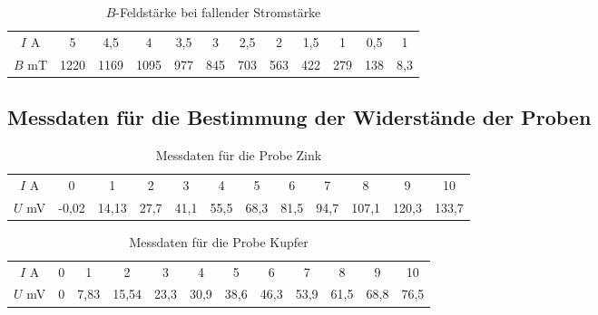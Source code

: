 \begin{table}
 \centering
 \label{tab:Messergebnisse_Feldstärke_Ifällt}
 \begin{tabular}[width=\textwidth]{S S[table-format=4.0] S[table-format=4.1] S[table-format=4.0] S[table-format=3.1] S[table-format=3.0] S[table-format=3.1] S[table-format=3.0] S[table-format=3.1] S[table-format=3.0] S[table-format=3.1] S[table-format=3.1]}
     \toprule
     \midrule
      $I$  \si{\ampere} & 5 & 4,5 & 4 & 3,5 & 3 & 2,5 & 2 & 1,5 & 1 & 0,5 & 1 \\
      $B$  \si{\milli\tesla} & 1220 & 1169 & 1095 & 977 & 845 & 703 & 563 & 422 & 279 & 138 & 8,3 \\
      \bottomrule
\end{tabular}
  \caption{$B$-Feldstärke bei fallender Stromstärke}
\end{table}

\subsection{Messdaten für die Bestimmung der Widerstände der Proben}

\begin{table}
 \centering
 \label{tab:Spannung_Zink}
 \begin{tabular}[width=\textwidth]{S S[table-format=1.2] S[table-format=2.2] S[table-format=2.1] S[table-format=2.1] S[table-format=2.1] S[table-format=2.1] S[table-format=2.1] S[table-format=2.1] S[table-format=3.1] S[table-format=3.1] S[table-format=3.1]}
     \toprule
     \midrule
      $I$  \si{\ampere} & 0 & 1 & 2 & 3 & 4 & 5 & 6 & 7 & 8 & 9 & 10 \\
      $U$  \si{\milli\volt} & -0,02 & 14,13 & 27,7 & 41,1 & 55,5 & 68,3 & 81,5 & 94,7 & 107,1 & 120,3 & 133,7 \\
      \bottomrule
\end{tabular}
  \caption{Messdaten für die Probe Zink}
\end{table}

\begin{table}
 \centering
 \label{tab:Spannung_Kupfer}
 \begin{tabular}[width=\textwidth]{S S[table-format=1.2] S[table-format=2.2] S[table-format=2.1] S[table-format=2.1] S[table-format=2.1] S[table-format=2.1] S[table-format=2.1] S[table-format=2.1] S[table-format=3.1] S[table-format=3.1] S[table-format=3.1]}
     \toprule
     \midrule
      $I$  \si{\ampere} & 0 & 1 & 2 & 3 & 4 & 5 & 6 & 7 & 8 & 9 & 10 \\
      $U$  \si{\milli\volt} & 0 & 7,83 & 15,54 & 23,3 & 30,9 & 38,6 & 46,3 & 53,9 & 61,5 & 68,8 & 76,5\\
      \bottomrule
\end{tabular}
  \caption{Messdaten für die Probe Kupfer}
\end{table}

